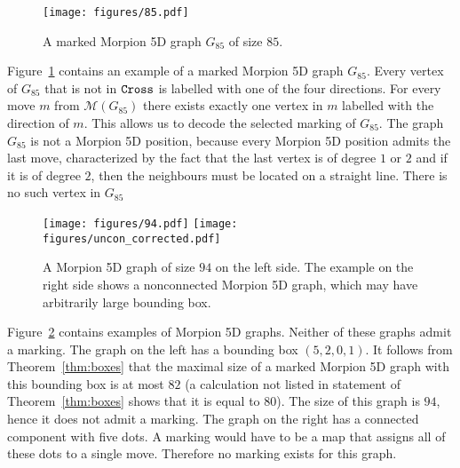 \begin{figure}[h]
    \centering
    \texttt{[image: figures/85.pdf]}
     \caption{
     A marked Morpion 5D graph $G_{85}$ of size $85$.
	}
    \label{fig:85}
\end{figure}

Figure~\ref{fig:85} contains an example of a marked Morpion 5D graph $G_{85}$. 
Every vertex of $G_{85}$ that is not in $\texttt{Cross}$ is labelled with one of the four directions. 
For every move $m$ from $\mathcal{M}(G_{85})$ there exists exactly one vertex in $m$ 
  labelled with the direction of $m$.
This allows us to decode the selected marking of $G_{85}$.
The graph $G_{85}$ is not a Morpion 5D position,  because every Morpion 5D position admits the last move, characterized by the fact that the last vertex is of degree $1$ or $2$ and if it is
of degree $2$, then the neighbours must be located on a straight line. 
There is no such vertex in $G_{85}$

\begin{figure}
  \centering
    \texttt{[image: figures/94.pdf]}
    \texttt{[image: figures/uncon\_corrected.pdf]}
  \caption{
    A Morpion 5D graph of size $94$ on the left side. 
    The example on the right side shows a nonconnected Morpion 5D graph,
      which may have arbitrarily large bounding box.
  }
  \label{fig:uncon}
\end{figure}

Figure~\ref{fig:uncon} contains examples of Morpion 5D graphs.
Neither of these graphs admit a marking.
The graph on the left has a bounding box $(5,2,0,1)$.
It follows from Theorem~\ref{thm:boxes} that the maximal size of a marked Morpion 5D graph with this 
  bounding box is at most $82$ (a calculation not listed in statement of Theorem~\ref{thm:boxes} shows that it is equal to $80$).
The size of this graph is $94$, hence it does not admit a marking.
The graph on the right has a connected component with five dots.
A marking would have to be a map that assigns all of these dots to a single move.
Therefore no marking exists for this graph.

